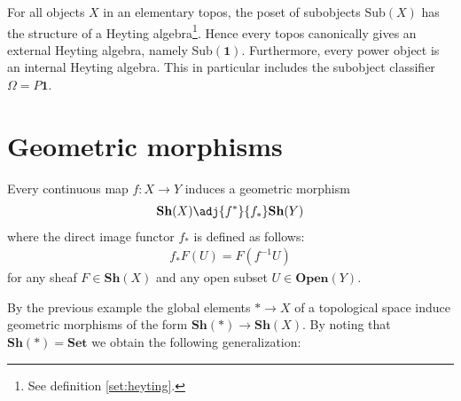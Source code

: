	\begin{property}
		For all objects $X$ in an elementary topos, the poset of subobjects Sub$(X)$ has the structure of a Heyting algebra\footnote{See definition \ref{set:heyting}.}. Hence every topos canonically gives an external Heyting algebra, namely Sub$(\mathbf{1})$. Furthermore, every power object is an internal Heyting algebra. This in particular includes the subobject classifier $\Omega=P{\mathbf{1}}$.
	\end{property}

\section{Geometric morphisms}


	
	\begin{example}
		Every continuous map $f:X\rightarrow Y$ induces a geometric morphism
		\begin{gather}
			\textbf{Sh}(X)\adj{f^*}{f_*}\textbf{Sh}(Y)
		\end{gather}
		where the direct image functor $f_*$ is defined as follows:
		\begin{gather}
			f_*F(U) = F(f^{-1}U)
		\end{gather}
		for any sheaf $F\in\textbf{Sh}(X)$ and any open subset $U\in\textbf{Open}(Y)$.
	\end{example}
	
	By the previous example the global elements $\ast\rightarrow X$ of a topological space induce geometric morphisms of the form $\textbf{Sh}(\ast)\rightarrow\textbf{Sh}(X)$. By noting that $\textbf{Sh}(\ast)=\textbf{Set}$ we obtain the following generalization:
	
